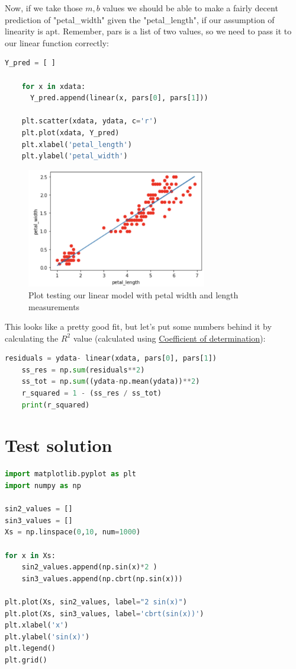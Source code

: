 \documentclass[12pt]{article}
\begin{document}
Now, if we take those $m,b$ values we should be able to make a fairly decent prediction of "petal\_width" given the "petal\_length", if our assumption of linearity is apt. Remember, pars is a list of two values, so we need to pass it to our linear function correctly:

\begin{lstlisting}[language=Python]
    Y_pred = [ ]

    for x in xdata:
      Y_pred.append(linear(x, pars[0], pars[1]))
    
    plt.scatter(xdata, ydata, c='r')
    plt.plot(xdata, Y_pred)
    plt.xlabel('petal_length')
    plt.ylabel('petal_width')
\end{lstlisting}

\begin{figure}[!h]
    \centering
    \includegraphics[width=0.7\textwidth]{figures/ssIM6.png}
    \caption{Plot testing our linear model with petal width and length measurements}
\end{figure}

This looks like a pretty good fit, but let's put some numbers behind it by calculating the $R^2$ value (calculated using \href{https://en.wikipedia.org/wiki/Coefficient_of_determination}{Coefficient of determination}):

\begin{lstlisting}[language=Python]
    residuals = ydata- linear(xdata, pars[0], pars[1])
    ss_res = np.sum(residuals**2)
    ss_tot = np.sum((ydata-np.mean(ydata))**2)
    r_squared = 1 - (ss_res / ss_tot)
    print(r_squared)
\end{lstlisting}


\clearpage
\appendix  
\section{Test solution}
\begin{lstlisting}[language=Python]
import matplotlib.pyplot as plt 
import numpy as np 

sin2_values = []
sin3_values = []
Xs = np.linspace(0,10, num=1000)

for x in Xs:
    sin2_values.append(np.sin(x)*2 )
    sin3_values.append(np.cbrt(np.sin(x)))

plt.plot(Xs, sin2_values, label="2 sin(x)")
plt.plot(Xs, sin3_values, label='cbrt(sin(x))')
plt.xlabel('x')
plt.ylabel('sin(x)')
plt.legend()
plt.grid()
\end{lstlisting}
\end{document}
